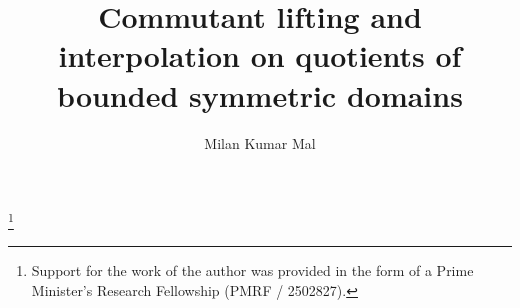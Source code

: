 \documentclass[12pt,reqno]{amsart}
\theoremstyle{remark}
\theoremstyle{definition}
\begin{document}
\title[Commutant lifting]{Commutant lifting and interpolation on quotients of bounded symmetric domains}

\author[M. K. Mal]{Milan Kumar Mal}
\address[M. K. Mal]{Department of Mathematics, Indian Institute of Technology Madras, Chennai 600036, India}


\thanks{Support for the work of the author was provided in the form of a Prime Minister's Research Fellowship (PMRF / 2502827).}






\date{}
\end{document}
